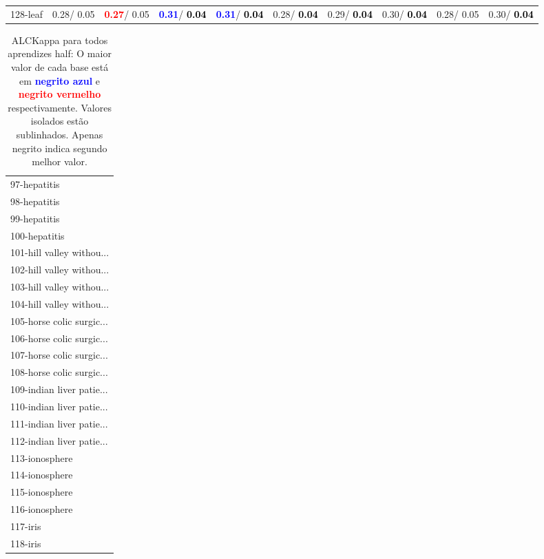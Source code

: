\begin{table}[h]
\begin{center}
{\begin{tabular}{lc|c|c|c|c|c|c|c|c}
128-leaf &   0.28/  0.05 & \textcolor{red}{\textbf{  0.27}}/  0.05 & \textcolor{blue}{\textbf{  0.31}}/\textcolor{black}{\textbf{  0.04}} & \textcolor{blue}{\textbf{  0.31}}/\textcolor{black}{\textbf{  0.04}} &   0.28/\textcolor{black}{\textbf{  0.04}} &   0.29/\textcolor{black}{\textbf{  0.04}} &   0.30/\textcolor{black}{\textbf{  0.04}} &   0.28/  0.05 &   0.30/\textcolor{black}{\textbf{  0.04}} \\\end{tabular}}\label{stratsALCKappa3AllRedux50a}
\end{center}
\end{table}
\begin{table}[h]
\caption{ALCKappa para todos aprendizes half: O maior valor de cada base está em \textcolor{blue}{\textbf{negrito azul}} e \textcolor{red}{\textbf{negrito vermelho}} respectivamente. Valores isolados estão sublinhados. Apenas negrito indica segundo melhor valor.}
\begin{center}\begin{tabular}{l}
 & \\ \hline 97-hepatitis &  \\
98-hepatitis &  \\
99-hepatitis &  \\
100-hepatitis &  \\
101-hill valley withou... &  \\
102-hill valley withou... &  \\
103-hill valley withou... &  \\ \hline
104-hill valley withou... &  \\
105-horse colic surgic... &  \\
106-horse colic surgic... &  \\
107-horse colic surgic... &  \\
108-horse colic surgic... &  \\
109-indian liver patie... &  \\
110-indian liver patie... &  \\ \hline
111-indian liver patie... &  \\
112-indian liver patie... &  \\
113-ionosphere &  \\
114-ionosphere &  \\
115-ionosphere &  \\
116-ionosphere &  \\
117-iris &  \\ \hline
118-iris &  \\

\end{tabular}
\end{center}
\end{table}
